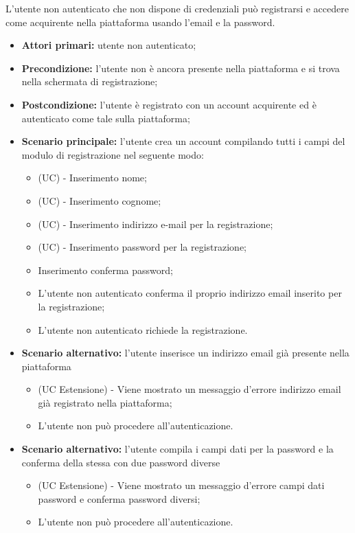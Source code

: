 L'utente non autenticato che non dispone di credenziali può registrarsi e accedere come acquirente nella piattaforma usando l'email e la password.
\begin{itemize}
    \item \textbf{Attori primari:} utente non autenticato;
    \item \textbf{Precondizione:} l'utente non è ancora presente nella piattaforma e si trova nella schermata di registrazione;
    \item \textbf{Postcondizione:} l'utente è registrato con un account acquirente ed è autenticato come tale sulla piattaforma;
    \item \textbf{Scenario principale:} l'utente crea un account compilando tutti i campi del modulo di registrazione nel seguente modo:
    \begin{itemize}
    	\item (UC) - Inserimento nome;
    	\item (UC) - Inserimento cognome;
        \item (UC) - Inserimento indirizzo e-mail per la registrazione;
        \item (UC) - Inserimento password per la registrazione;
        \item Inserimento conferma password;
        \item L'utente non autenticato conferma il proprio indirizzo email inserito per la registrazione;
        \item L'utente non autenticato richiede la registrazione.
    \end{itemize}
	\item \textbf{Scenario alternativo:} l'utente inserisce un indirizzo email già presente nella piattaforma
	\begin{itemize}
		\item (UC Estensione) - Viene mostrato un messaggio d'errore indirizzo email già registrato nella piattaforma;
		\item L'utente non può procedere all'autenticazione.
	\end{itemize}
	\item \textbf{Scenario alternativo:} l'utente compila i campi dati per la password e la conferma della stessa con due password diverse
	\begin{itemize}
		\item (UC Estensione) - Viene mostrato un messaggio d'errore campi dati password e conferma password diversi;
		\item L'utente non può procedere all'autenticazione.

\end{itemize}
\end{itemize}
